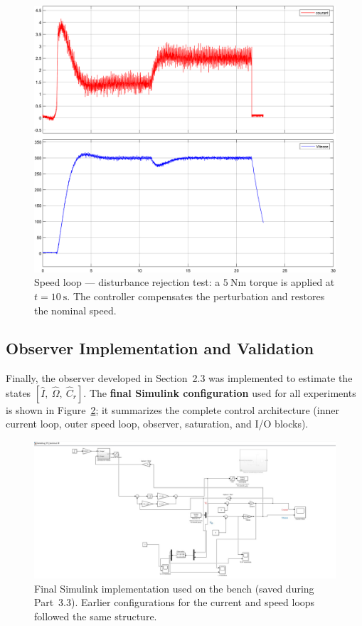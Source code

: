 \documentclass{rapportCS}
\begin{document}
\begin{figure}[H]
    \centering
    \includegraphics[width=\linewidth, keepaspectratio]{figures/p300cr5.png}
    \caption{Speed loop --- disturbance rejection test: a $5~\text{Nm}$ torque is applied at $t=10~\text{s}$. 
    The controller compensates the perturbation and restores the nominal speed.}
    \label{fig:exp_W_disturbance}
\end{figure}

\subsection{Observer Implementation and Validation}
\label{subsec:exp_obs}

Finally, the observer developed in Section~2.3 was implemented to estimate the states $[\hat I,\ \hat\Omega,\ \hat C_r]$. 
The \textbf{final Simulink configuration} used for all experiments is shown in Figure~\ref{fig:exp_obs_model}; it summarizes the complete control architecture (inner current loop, outer speed loop, observer, saturation, and I/O blocks).

\begin{figure}[H]
    \centering
    \includegraphics[width=\linewidth, keepaspectratio]{figures/simulink.png}
    \caption{Final Simulink implementation used on the bench (saved during Part~3.3). 
    Earlier configurations for the current and speed loops followed the same structure.}
    \label{fig:exp_obs_model}
\end{figure}
\end{document}
